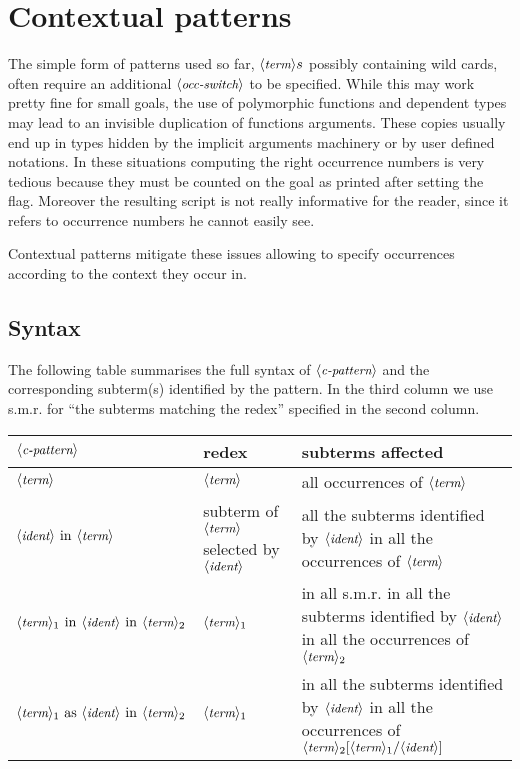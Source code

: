 \section{Contextual patterns}
\label{ssec:rewp}

The simple form of patterns used so far, $\langle\mbox{\itshape\rmfamily\small term}\rangle s$ possibly containing 
wild cards, often require an additional $\langle\mbox{\itshape\rmfamily\small occ-switch}\rangle$ to be specified.
While this may work pretty fine for small goals, the use of polymorphic
functions and dependent types may lead to an invisible duplication of functions
arguments. These copies usually end up in types hidden by the implicit
arguments machinery or by user defined notations.  In these situations
computing the right occurrence numbers is very tedious because they must be
counted on the goal as printed after setting the  flag.
Moreover the resulting script is not really informative for the reader, since
it refers to occurrence numbers he cannot easily see.

Contextual patterns mitigate these issues allowing to specify occurrences
according to the context they occur in.

\subsection{Syntax}

The following table summarises the full syntax of
$\langle\mbox{\itshape\rmfamily\small c-pattern}\rangle$ and the corresponding subterm(s) identified
by the pattern.
In the third column we use s.m.r. for
``the subterms matching the redex'' specified in the second column.

\begin{center}
\begin{tabularx}{\textwidth}{>{\arraybackslash}m{}|>{\arraybackslash}m{}|>{\arraybackslash}m{}}
$\langle\mbox{\itshape\rmfamily\small c-pattern}\rangle$ & redex & subterms affected \\
\hline
$\langle\mbox{\itshape\rmfamily\small term}\rangle$ & $\langle\mbox{\itshape\rmfamily\small term}\rangle$ & all occurrences of $\langle\mbox{\itshape\rmfamily\small term}\rangle$\\
\hline
$\N{ident}\ \C{in}\ \N{term}$ & 
  subterm of $\langle\mbox{\itshape\rmfamily\small term}\rangle$ selected by $\langle\mbox{\itshape\rmfamily\small ident}\rangle$ &
  all the subterms identified by $\langle\mbox{\itshape\rmfamily\small ident}\rangle$ in all 
  the occurrences of $\langle\mbox{\itshape\rmfamily\small term}\rangle$ \\
\hline
$\N{term}_1\ \C{in}\ \N{ident}\ \C{in}\ \N{term}_2$ & $\langle\mbox{\itshape\rmfamily\small term}\rangle_1$ &
  in all  s.m.r. in all the subterms identified by $\langle\mbox{\itshape\rmfamily\small ident}\rangle$ in all 
  the occurrences of $\langle\mbox{\itshape\rmfamily\small term}\rangle_2$ \\
\hline
$\N{term}_1\ \C{as}\ \N{ident}\ \C{in}\ \N{term}_2$ & $\langle\mbox{\itshape\rmfamily\small term}\rangle_1$ &
  in all the subterms identified by $\langle\mbox{\itshape\rmfamily\small ident}\rangle$ in all 
  the occurrences of $\langle\mbox{\itshape\rmfamily\small term}\rangle_2[\langle\mbox{\itshape\rmfamily\small term}\rangle_1/\langle\mbox{\itshape\rmfamily\small ident}\rangle]$\\
\hline
\end{tabularx}
\end{center}

